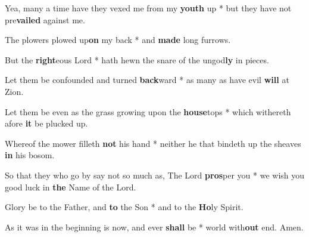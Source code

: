 \begin{multicols}{2}
	Yea, many a time have they vexed me from my \textbf{youth} up * but they have not pre\textbf{vailed} against me.
	
	The plowers plowed up\textbf{on} my back * and \textbf{made} long furrows.
	
	But the \textbf{right}eous Lord * hath hewn the snare of the ungod\textbf{ly} in pieces.
	
	Let them be confounded and turned \textbf{back}ward * as many as have evil \textbf{will} at Zion.
	
	Let them be even as the grass growing upon the \textbf{house}tops * which withereth afore \textbf{it} be plucked up.
	
	Whereof the mower filleth \textbf{not} his hand * neither he that bindeth up the sheaves \textbf{in} his bosom.
	
	So that they who go by say not so much as, The Lord \textbf{pros}per you * we wish you good luck in \textbf{the} Name of the Lord.
	
	Glory be to the Father, and \textbf{to} the Son * and to the \textbf{Ho}ly Spirit.
	
	As it was in the beginning is now, and ever \textbf{shall} be * world with\textbf{out} end. Amen.
\end{multicols}